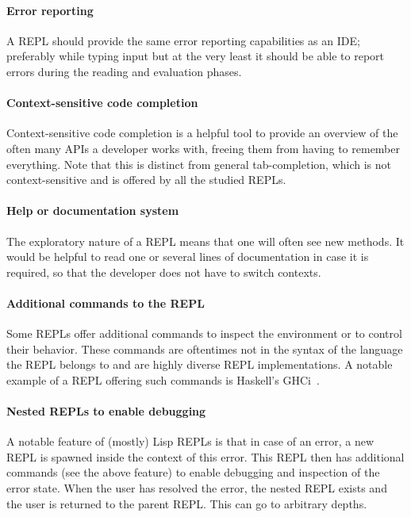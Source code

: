 \paragraph{Error reporting} A REPL should provide the same error reporting
capabilities as an IDE; preferably while typing input but at the very least it
should be able to report errors during the reading and evaluation phases.

\paragraph{Context-sensitive code completion} Context-sensitive code completion
is a helpful tool to provide an overview of the often many APIs a developer
works with, freeing them from having to remember everything. Note that this is
distinct from general tab-completion, which is not context-sensitive and is
offered by all the studied REPLs.

\paragraph{Help or documentation system} The exploratory nature of a REPL means
that one will often see new methods. It would be helpful to read one or several
lines of documentation in case it is required, so that the developer does not
have to switch contexts.

\paragraph{Additional commands to the REPL} Some REPLs offer additional
commands to inspect the environment or to control their behavior. These commands
are oftentimes not in the syntax of the language the REPL belongs to and are
highly diverse REPL implementations. A notable example of a REPL offering such
commands is Haskell's GHCi~\cite{GHCi-commands}.

\paragraph{Nested REPLs to enable debugging} A notable feature of (mostly) Lisp
REPLs is that in case of an error, a new REPL is spawned inside the context of
this error. This REPL then has additional commands (see the above feature) to
enable debugging and inspection of the error state. When the user has
resolved the error, the nested REPL exists and the user is returned to the
parent REPL. This can go to arbitrary depths.


